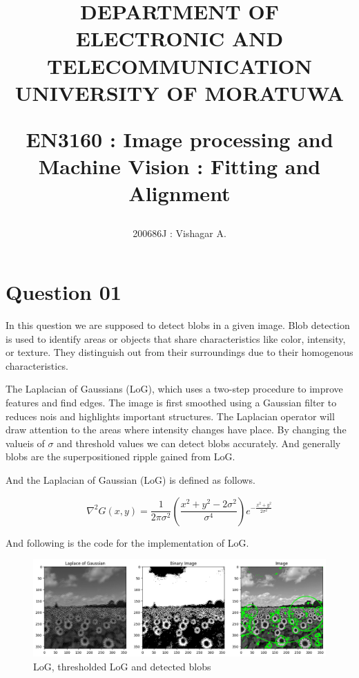 \documentclass[11pt,a4paper]{article}
\title{DEPARTMENT OF ELECTRONIC AND TELECOMMUNICATION
UNIVERSITY OF MORATUWA

{\textsf{EN3160 : Image processing and Machine Vision : Fitting and Alignment}}}
\author{200686J : Vishagar A.}
\begin{document}
\twocolumn

\maketitle

\section{Question 01}
In this question we are supposed to detect blobs in a given image. 
Blob detection is used to identify areas or objects that share characteristics like color, intensity, or texture. 
They distinguish out from their surroundings due to their homogenous characteristics.

The Laplacian of Gaussians (LoG), which uses a two-step procedure to improve features and find edges. 
The image is first smoothed using a Gaussian filter to reduces nois and highlights important structures. 
The Laplacian operator will draw attention to the areas where intensity changes have place.
By changing the valueis of $\sigma$ and threshold values we can detect blobs accurately.
And generally blobs are the superpositioned ripple gained from LoG.

And the Laplacian of Gaussian (LoG) is defined as follows.

\begin{equation}
    \nabla^2G(x,y) = \frac{1}{2\pi\sigma^2}(\frac{x^2+y^2-2\sigma^2}{\sigma^4})e^{-\frac{x^2+y^2}{2\sigma^2}}
\end{equation}

And following is the code for the implementation of LoG.

\lstset{style=mystyle}


{\begin{figure}[h]
    \centering
    \includegraphics[width=1.0\linewidth]{images/1.png}
    \caption{LoG, thresholded LoG and detected blobs}
\end{figure}}
\end{document}
